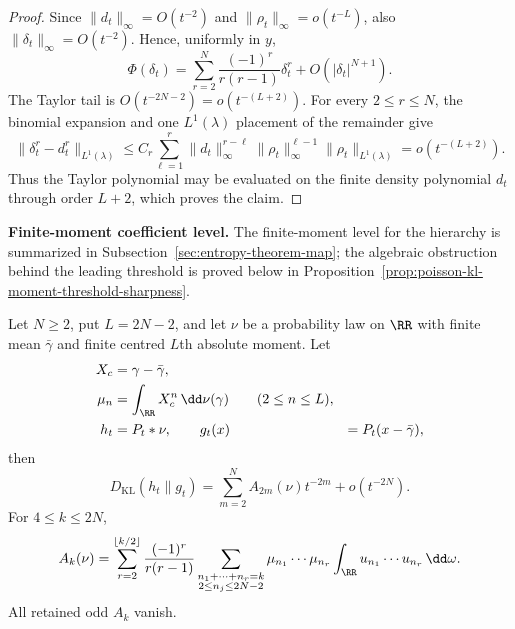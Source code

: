 \begin{proof}
Since \(\|d_t\|_\infty=O(t^{-2})\) and
\(\|\rho_t\|_\infty=o(t^{-L})\), also
\(\|\delta_t\|_\infty=O(t^{-2})\).  Hence, uniformly in \(y\),
\[
\Phi(\delta_t)=
\sum_{r=2}^{N}\frac{(-1)^r}{r(r-1)}\delta_t^r
+O(|\delta_t|^{N+1}).
\]
The Taylor tail is \(O(t^{-2N-2})=o(t^{-(L+2)})\).  For every
\(2\le r\le N\), the binomial expansion and one \(L^1(\lambda)\) placement
of the remainder give
\[
\|\delta_t^r-d_t^r\|_{L^1(\lambda)}
\le
C_r\sum_{\ell=1}^{r}
\|d_t\|_\infty^{r-\ell}
\|\rho_t\|_\infty^{\ell-1}
\|\rho_t\|_{L^1(\lambda)}
=o(t^{-(L+2)}).
\]
Thus the Taylor polynomial may be evaluated on the finite density polynomial
\(d_t\) through order \(L+2\), which proves the claim.
\end{proof}

\medskip
{}\label{par:coefficient-evaluability-scope}
\noindent\textbf{Finite-moment coefficient level.}
The finite-moment level for the hierarchy is summarized in
Subsection~\ref{sec:entropy-theorem-map}; the algebraic obstruction
behind the leading threshold is proved below in
Proposition~\ref{prop:poisson-kl-moment-threshold-sharpness}.
\medskip

\begin{theorem}%
\label{thm:poisson-kl-even-orders}
Let \(N\ge2\), put \(L=2N-2\), and let \(\nu\) be a probability law on
\(\RR\) with finite mean \(\bar{\gamma}\) and finite centred \(L\)th absolute
moment.  Let
\[
\begin{aligned}
X_c&=\gamma-\bar{\gamma},\\
\mu_n&=\int_{\RR} X_c^n\,\dd\nu(\gamma)\qquad(2\le n\le L),\\
h_t&=P_t*\nu,\qquad
g_t(x)&=P_t(x-\bar{\gamma}),
\end{aligned}
\]
then
\begin{equation}\label{eq:poisson-kl-even-orders}
D_{\mathrm{KL}}(h_t\|g_t)
=\sum_{m=2}^{N}A_{2m}(\nu)t^{-2m}+o(t^{-2N}).
\end{equation}
For \(4\le k\le2N\),
\begin{equation}\label{eq:coefficient-identification-transfer-expansion}
A_k(\nu)=
\sum_{r=2}^{\lfloor k/2\rfloor}
\frac{(-1)^r}{r(r-1)}
\sum_{\substack{n_1+\cdots+n_r=k\\2\le n_j\le2N-2}}
\mu_{n_1}\cdots\mu_{n_r}
\int_{\RR}u_{n_1}\cdots u_{n_r}\,\dd\omega .
\end{equation}
All retained odd \(A_k\) vanish.
\end{theorem}

